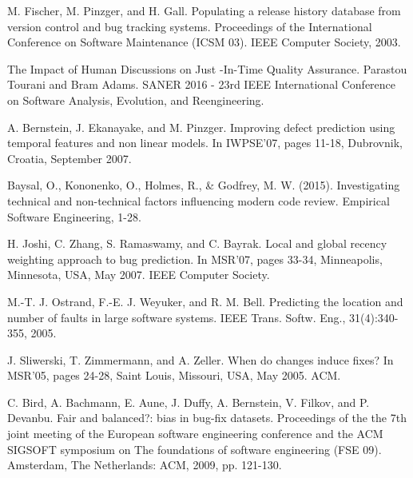 %
%

%
% 
% 
%
\begin{thebibliography}{99.}
%
%
%
 M. Fischer, M. Pinzger, and H. Gall. Populating a release history database from version 
control and bug tracking systems. Proceedings of the International Conference on Software Maintenance 
(ICSM 03). IEEE Computer Society, 2003.

 The Impact of Human Discussions on Just
-In-Time Quality Assurance. Parastou Tourani and Bram Adams. SANER 2016 - 
23rd IEEE International Conference on Software Analysis, Evolution, and Reengineering.

  A. Bernstein, J. Ekanayake, and M. Pinzger. Improving defect prediction 
using temporal features and non linear models. In IWPSE'07, pages 11-18, Dubrovnik, Croatia,
September 2007.

 Baysal, O., Kononenko, O., Holmes, R., \& Godfrey, M. W. (2015). Investigating 
technical and non-technical factors influencing modern code review. Empirical Software Engineering, 
1-28.

 H. Joshi, C. Zhang, S. Ramaswamy, and C. Bayrak. Local and global recency 
weighting approach to bug prediction. In MSR'07, pages 33-34, Minneapolis, Minnesota, USA,
May 2007. IEEE Computer Society.

 M.-T. J. Ostrand, F.-E. J. Weyuker, and R. M. Bell. Predicting the location 
and number of faults in large software systems. IEEE Trans. Softw. Eng., 31(4):340-355, 2005.

 J. Sliwerski, T. Zimmermann, and A. Zeller. When do changes induce fixes? In 
MSR'05, pages 24-28, Saint Louis, Missouri, USA, May 2005. ACM.

 C. Bird, A. Bachmann, E. Aune, J. Duffy, A. Bernstein, V. Filkov, and P. Devanbu. 
Fair and balanced?: bias in bug-fix  datasets. Proceedings of the the 7th joint meeting of the 
European software engineering conference and the ACM SIGSOFT symposium on The foundations of 
software engineering (FSE 09). Amsterdam, The Netherlands: ACM, 2009, pp. 121-130.


\end{thebibliography}
